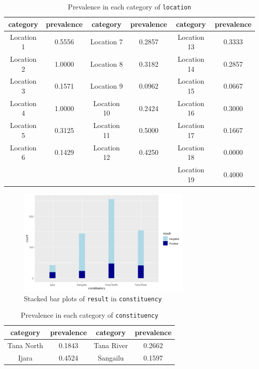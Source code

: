 \documentclass[11pt,twoside]{article}
\numberwithin{Theorem}{section}
\numberwithin{Definition}{section}
\numberwithin{Lemma}{section}
\numberwithin{Algorithm}{section}
\numberwithin{equation}{section}
\begin{document}
\begin{table}[!h]
	\centering
	\begin{tabular}{|c|c|c|c|c|c|}
		\hline
		category & prevalence & category & prevalence & category & prevalence \\
		\hline
		Location 1 & 0.5556 & Location 7 & 0.2857  & Location 13 & 0.3333 \\
		Location 2 & 1.0000	 & Location 8 & 0.3182 & Location 14 & 0.2857 \\
		Location 3 & 0.1571 & Location 9 & 0.0962 & Location 15 & 0.0667 \\
		Location 4 & 1.0000 & Location 10 & 0.2424 & Location 16 & 0.3000 \\
		Location 5 & 0.3125 & Location 11 & 0.5000 & Location 17 & 0.1667 \\
		Location 6 & 0.1429 & Location 12 & 0.4250 & Location 18 & 0.0000 \\
		 & & & & Location 19 & 0.4000 \\	
		\hline			
	\end{tabular}
	\caption{Prevalence in each category of \texttt{location}}
	\label{tab:location}
\end{table}

\begin{figure}[!h]
	\centering
	\includegraphics[width = 0.75\textwidth]{Images/constituency.png}
	\caption{Stacked bar plots of \texttt{result} in \texttt{constituency}}
	\label{fig:constituency}
\end{figure}	

\begin{table}[!h]
	\centering
	\begin{tabular}{|c|c|c|c|}
		\hline
		category & prevalence & category & prevalence \\
		\hline
		Tana North & 0.1843 & Tana River & 0.2662 \\
		Ijara & 0.4524 & Sangailu & 0.1597 \\
		\hline			
	\end{tabular}
	\caption{Prevalence in each category of \texttt{constituency}}
	\label{tab:constituency}
\end{table}
\end{document}
